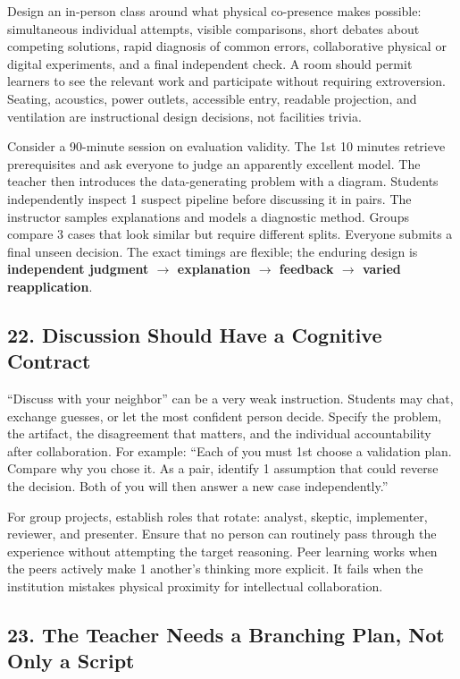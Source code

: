 Design an in-person class around what physical co-presence makes possible: simultaneous individual attempts, visible comparisons, short debates about competing solutions, rapid diagnosis of common errors, collaborative physical or digital experiments, and a final independent check. A room should permit learners to see the relevant work and participate without requiring extroversion. Seating, acoustics, power outlets, accessible entry, readable projection, and ventilation are instructional design decisions, not facilities trivia.

Consider a 90-minute session on evaluation validity. The 1st 10 minutes retrieve prerequisites and ask everyone to judge an apparently excellent model. The teacher then introduces the data-generating problem with a diagram. Students independently inspect 1 suspect pipeline before discussing it in pairs. The instructor samples explanations and models a diagnostic method. Groups compare 3 cases that look similar but require different splits. Everyone submits a final unseen decision. The exact timings are flexible; the enduring design is \textbf{independent judgment $\to$ explanation $\to$ feedback $\to$ varied reapplication}.

\subsection*{22. Discussion Should Have a Cognitive Contract}

``Discuss with your neighbor'' can be a very weak instruction. Students may chat, exchange guesses, or let the most confident person decide. Specify the problem, the artifact, the disagreement that matters, and the individual accountability after collaboration. For example: ``Each of you must 1st choose a validation plan. Compare why you chose it. As a pair, identify 1 assumption that could reverse the decision. Both of you will then answer a new case independently.''

For group projects, establish roles that rotate: analyst, skeptic, implementer, reviewer, and presenter. Ensure that no person can routinely pass through the experience without attempting the target reasoning. Peer learning works when the peers actively make 1 another's thinking more explicit. It fails when the institution mistakes physical proximity for intellectual collaboration.

\subsection*{23. The Teacher Needs a Branching Plan, Not Only a Script}

